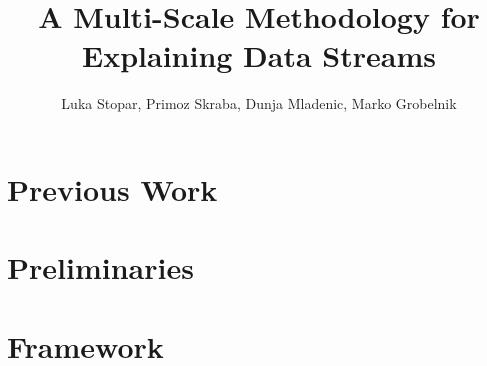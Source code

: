 \documentclass[journal]{vgtc}                %
\title{A Multi-Scale Methodology for Explaining Data Streams}
\author{Luka Stopar, Primoz Skraba, Dunja Mladenic, Marko Grobelnik}
\theoremstyle{definition}
\begin{document}

\maketitle

\label{sec:introduction}





\section{Previous Work}
\label{sec:previous}


\section{Preliminaries}


\section{Framework}
\label{sec:multiscale-framework}

\end{document}
